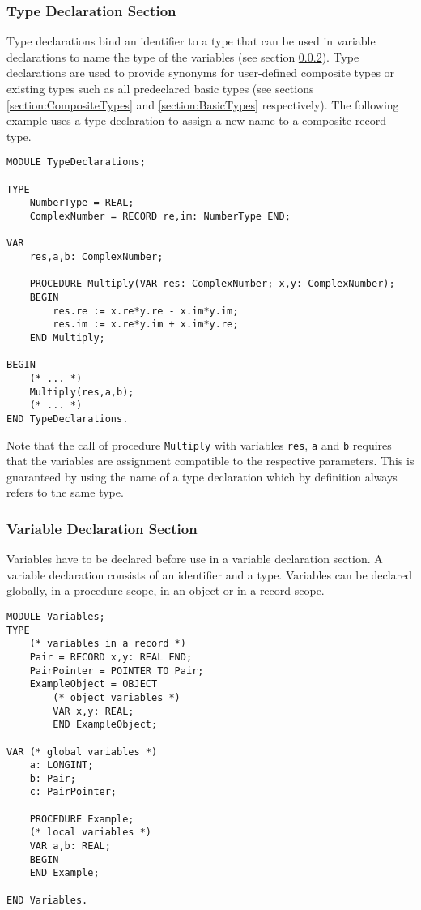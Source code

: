 \documentclass[a4paper,11pt]{article}
\begin{document}
\subsubsection{Type Declaration Section}\label{section:TypeDeclarationSection}
Type declarations bind an identifier to a type that can be used in variable declarations to name the type of the variables (see section \ref{section:VariableDeclarationSection}). Type declarations are used to provide synonyms for user-defined composite types or existing types such as all predeclared basic types (see sections \ref{section:CompositeTypes} and \ref{section:BasicTypes} respectively). The following example uses a type declaration to assign a new name to a composite record type.

\begin{lstlisting}[language=Oberon,frame=none,caption={Using Type Declarations}]
MODULE TypeDeclarations;

TYPE
    NumberType = REAL;
    ComplexNumber = RECORD re,im: NumberType END;

VAR
    res,a,b: ComplexNumber;

    PROCEDURE Multiply(VAR res: ComplexNumber; x,y: ComplexNumber);
    BEGIN
        res.re := x.re*y.re - x.im*y.im;
        res.im := x.re*y.im + x.im*y.re;
    END Multiply;

BEGIN
    (* ... *)
    Multiply(res,a,b);
    (* ... *)
END TypeDeclarations.
\end{lstlisting}

Note that the call of procedure \verb+Multiply+ with variables \verb+res+, \verb+a+ and \verb+b+ requires that the variables are assignment compatible to the respective parameters. This is guaranteed by using the name of a type declaration which by definition always refers to the same type.

\subsubsection{Variable Declaration Section}\label{section:VariableDeclarationSection}
Variables have to be declared before use in a variable declaration section. A variable declaration consists of an identifier and a type. Variables can be declared globally, in a procedure scope, in an object or in a record scope.

\begin{lstlisting}[language=Oberon,frame=none,caption={Variables and Parameters}]
MODULE Variables;
TYPE
    (* variables in a record *)
    Pair = RECORD x,y: REAL END;
    PairPointer = POINTER TO Pair;
    ExampleObject = OBJECT
        (* object variables *)
        VAR x,y: REAL;
        END ExampleObject;

VAR (* global variables *)
    a: LONGINT;
    b: Pair;
    c: PairPointer;

    PROCEDURE Example;
    (* local variables *)
    VAR a,b: REAL;
    BEGIN
    END Example;

END Variables.
\end{lstlisting}
\end{document}
